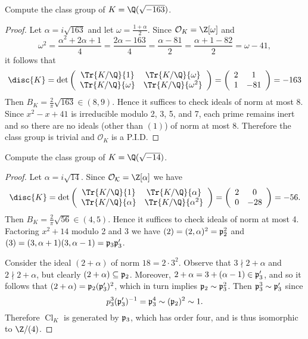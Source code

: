 \documentclass[10pt]{amsart}
\begin{document}
\begin{thm}
  Compute the class group of $K = \Q(\sqrt{-163})$.
  
  \begin{proof}
    Let $\alpha = i\sqrt{163}$ and let $\omega = \frac{1 + \alpha}{2}$.
    Since $\mathcal{O}_K = \Z[\omega]$ and 
    $$\omega^2 = \frac{\alpha^2 + 2\alpha + 1}{4} = \frac{2\alpha - 163}{4} = \frac{\alpha - 81}{2} = \frac{\alpha+ 1 - 82}{2} = \omega - 41,$$
    it follows that
    $$\disc{K} = \operatorname{det}\left(\begin{array}{cc}
      \Tr{K/\Q}{1} & \Tr{K/\Q}{\omega}\\
      \Tr{K/\Q}{\omega} & \Tr{K/\Q}{\omega^2}
    \end{array}
    \right) =
    \left(\begin{array}{cc}
      2 & 1\\
      1 & -81
      \end{array}
    \right) = -163$$
    Then $B_K = \frac{2}{\pi}\sqrt{163} \in (8,9)$.
    Hence it suffices to check ideals of norm at most 8.
    Since $x^2 - x + 41$ is irreducible modulo 2, 3, 5, and 7, each prime remains inert and so there are no ideals (other than $(1)$) of norm at most 8.
    Therefore the class group is trivial and $\mathcal{O}_K$ is a P.I.D.
  \end{proof}
\end{thm}

\begin{thm}
  Compute the class group of $K = \Q(\sqrt{-14})$.
  
  \begin{proof}
    Let $\alpha = i\sqrt{14}$.
    Since $\mathcal{O_K} = \Z[\alpha]$ we have
    $$
    \disc{K} = \operatorname{det}\left(\begin{array}{cc}
      \Tr{K/\Q}{1} & \Tr{K/\Q}{\alpha}\\
      \Tr{K/\Q}{\alpha} & \Tr{K/\Q}{\alpha^2}
    \end{array}
    \right) = 
    \left(\begin{array}{cc}
      2 & 0\\
      0 & -28
      \end{array}
    \right) =
    -56.
    $$
    Then $B_K = \frac{2}{\pi}\sqrt{56} \in (4,5)$.
    Hence it suffices to check ideals of norm at most 4.
    Factoring $x^2 + 14$ modulo 2 and 3 we have $(2) = (2, \alpha)^2 = \mathfrak{p}_2^2$ and $(3) = (3, \alpha + 1)(3, \alpha - 1) = \mathfrak{p}_3\mathfrak{p}_3^\prime$.

    Consider the ideal $(2 + \alpha)$ of norm $18 = 2\cdot 3^2$.
    Observe that $3 \nmid 2 + \alpha$ and $2 \nmid 2 + \alpha$, but clearly $(2 + \alpha) \subseteq \mathfrak{p}_2$.
    Moreover, $2 + \alpha = 3 + (\alpha - 1) \in \mathfrak{p}_3^\prime$, and so it follows that $(2 + \alpha) = \mathfrak{p}_2(\mathfrak{p}_3^\prime)^2$, which in turn implies $\mathfrak{p}_2 \sim \mathfrak{p}_3^2$.
    Then $\mathfrak{p}_3^3 \sim \mathfrak{p}_3^\prime$ since 
    $$p_3^3(\mathfrak{p}_3^\prime)^{-1} = \mathfrak{p}_3^4 \sim (\mathfrak{p}_2)^2 \sim 1.$$
    Therefore $\operatorname{Cl}_K$ is generated by $\mathfrak{p}_3$, which has order four, and is thus isomorphic to $\Z/(4)$.
  \end{proof}
\end{thm}
\end{document}
